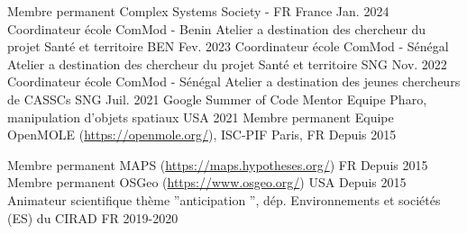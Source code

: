 

\begin{cvhonors}

  \cvhonor
     {Membre permanent} %
     {Complex Systems Society - FR} %
     {France} %
     {Jan. 2024} %
  \cvhonor
     {Coordinateur école ComMod - Benin} %
     {Atelier a destination des chercheur du projet Santé et territoire} %
     {BEN} %
     {Fev. 2023} %
  \cvhonor
    {Coordinateur école ComMod - Sénégal} %
    {Atelier a destination des chercheur du projet Santé et territoire} %
    {SNG} %
    {Nov. 2022} %
  \cvhonor
    {Coordinateur école ComMod - Sénégal} %
    {Atelier a destination des jeunes chercheurs de CASSCs} %
    {SNG} %
    {Juil. 2021} %
  \cvhonor
    {Google Summer of Code Mentor} %
    {Equipe Pharo, manipulation d'objets spatiaux} %
    {USA} %
    {2021} %
    \cvhonor
      {Membre permanent} %
      {Equipe OpenMOLE (\url{https://openmole.org/}), ISC-PIF} %
      {Paris, FR} %
      {Depuis 2015} %

    \cvhonor
      {Membre permanent} %
      {MAPS (\url{https://maps.hypotheses.org/})} %
      {FR} %
      {Depuis 2015} %
    \cvhonor
      {Membre permanent} %
      {OSGeo (\url{https://www.osgeo.org/})} %
      {USA} %
      {Depuis 2015} %
  \cvhonor
    {Animateur scientifique} %
    {thème ”anticipation ”, dép. Environnements et sociétés (ES) du CIRAD} %
    {FR} %
    {2019-2020} %


\end{cvhonors}
